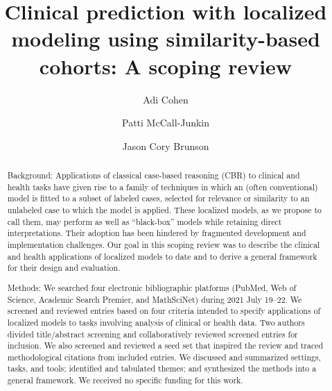 \documentclass[preprint, 3p,
authoryear]{elsarticle} %
\begin{document}
\begin{frontmatter}

  \title{Clinical prediction with localized modeling using
similarity-based cohorts: A scoping review}
    \author[1]{Adi Cohen%
  }
    \author[2]{Patti McCall-Junkin%
  }
    \author[3]{Jason Cory Brunson%
  }
  
  \begin{abstract}
  Background: Applications of classical case-based reasoning (CBR) to
  clinical and health tasks have given rise to a family of techniques in
  which an (often conventional) model is fitted to a subset of labeled
  cases, selected for relevance or similarity to an unlabeled case to
  which the model is applied. These localized models, as we propose to
  call them, may perform as well as ``black-box'' models while retaining
  direct interpretations. Their adoption has been hindered by fragmented
  development and implementation challenges. Our goal in this scoping
  review was to describe the clinical and health applications of
  localized models to date and to derive a general framework for their
  design and evaluation.

  Methods: We searched four electronic bibliographic platforms (PubMed,
  Web of Science, Academic Search Premier, and MathSciNet) during 2021
  July 19--22. We screened and reviewed entries based on four criteria
  intended to specify applications of localized models to tasks
  involving analysis of clinical or health data. Two authors divided
  title/abstract screening and collaboratively reviewed screened entries
  for inclusion. We also screened and reviewed a seed set that inspired
  the review and traced methodological citations from included entries.
  We discussed and summarized settings, tasks, and tools; identified and
  tabulated themes; and synthesized the methods into a general
  framework. We received no specific funding for this work.


\end{abstract}
\end{frontmatter}
\end{document}
